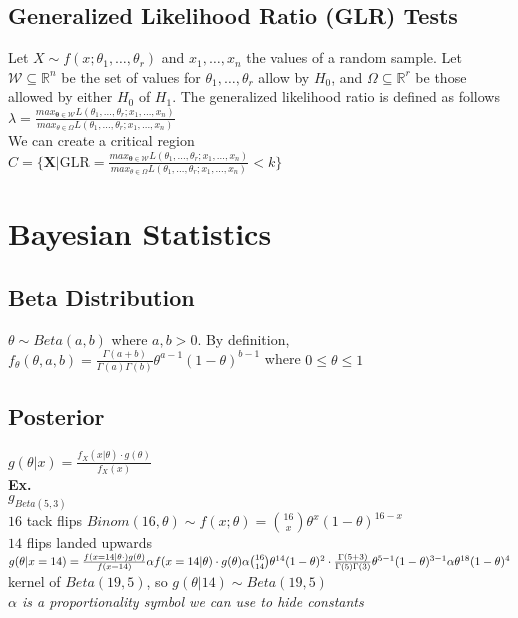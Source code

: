 \documentclass{article}
\begin{document}
\subsection{Generalized Likelihood Ratio (GLR) Tests}
Let $X\sim f(x;\theta_1,\dots,\theta_r)$ and $x_1,\dots,x_n$ the values of a random sample. Let $\mathcal{W}\subseteq \mathbb{R}^n$ be the set of values for $\theta_1,\dots,\theta_r$ allow by $H_0$, and $\Omega\subseteq\mathbb{R}^r$ be those allowed by either $H_0$ of $H_1$. The generalized likelihood ratio is defined as follows\\
$\lambda=\frac{max_{\mathbf{\theta}\in\mathcal{W}}L(\theta_1,\dots,\theta_r;x_1,\dots,x_n)}{max_{\theta\in\Omega}L(\theta_1,\dots,\theta_r;x_1,\dots,x_n)}$\\
We can create a critical region\\
$C=\{\mathbf{X}\vert \text{GLR}=\frac{max_{\mathbf{\theta}\in\mathcal{W}}L(\theta_1,\dots,\theta_r;x_1,\dots,x_n)}{max_{\theta\in\Omega}L(\theta_1,\dots,\theta_r;x_1,\dots,x_n)}<k\}$
\newpage
\section{Bayesian Statistics}
\label{sec:bayes}
\subsection{Beta Distribution}
$\theta\sim Beta(a,b)$ where $a,b>0$. By definition,\\
$f_\theta(\theta,a,b)=\frac{\Gamma(a+b)}{\Gamma(a)\Gamma(b)}\theta^{a-1}(1-\theta)^{b-1}$ where $0\leq \theta\leq 1$
\subsection{Posterior}
$g(\theta\vert x)=\frac{f_X(x\vert\theta)\cdot g(\theta)}{f_X(x)}$\\
\textbf{Ex.}\\
$g_{Beta(5,3)}$\\
$16$ tack flips $Binom(16,\theta)\sim f(x;\theta)=\binom{16}{x}\theta^x(1-\theta)^{16-x}$\\
$14$ flips landed upwards\\
$g(\theta\vert x=14)=\frac{f(x=14\vert \theta\cdot) g(\theta)}{f(x=14)}\alpha f(x=14\vert\theta)\cdot g(\theta)\alpha\binom{16}{14}\theta^{14}(1-\theta)^2\cdot\frac{\Gamma(5+3)}{\Gamma(5)\Gamma(3)}\theta^{5-1}(1-\theta)^{3-1}\\
\alpha\theta^{18}(1-\theta)^4$ kernel of $Beta(19,5)$, so $g(\theta\vert 14)\sim Beta(19,5)$\\
\textit{$\alpha$ is a proportionality symbol we can use to hide constants}
\end{document}
